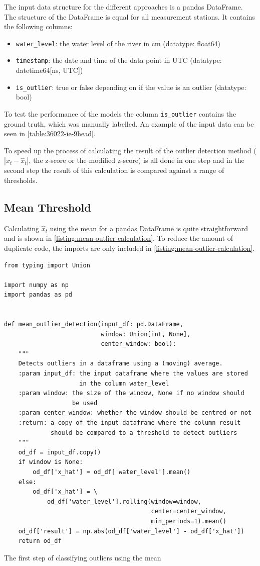The input data structure for the different approaches is a pandas DataFrame.\cite{PandasDocumentationPandas} The structure of the DataFrame is equal for all measurement stations. It contains the following columns:
\begin{itemize}
    \item \verb|water_level|: the water level of the river in cm (datatype: float64)
    \item \verb|timestamp|: the date and time of the data point in UTC (datatype: datetime64[ns, UTC])
    \item \verb|is_outlier|: true or false depending on if the value is an outlier (datatype: bool)
\end{itemize}
To test the performance of the models the column \verb|is_outlier| contains the ground truth, which was manually labelled. An example of the input data can be seen in \autoref{table:36022-ie-9head}.


To speed up the process of calculating the result of the outlier detection method ($|x_t - \hat{x}_t|$, the z-score or the modified z-score) is all done in one step and in the second step the result of this calculation is compared against a range of thresholds.
\subsection{Mean Threshold}
Calculating $\hat{x}_t$ using the mean for a pandas DataFrame \cite{PandasDocumentationPandas} is quite straightforward and is shown in \autoref{listing:mean-outlier-calculation}. To reduce the amount of duplicate code, the imports are only included in \autoref{listing:mean-outlier-calculation}.
\begin{listing}
\begin{verbatim}
from typing import Union

import numpy as np
import pandas as pd


def mean_outlier_detection(input_df: pd.DataFrame,
                           window: Union[int, None],
                           center_window: bool):
    """
    Detects outliers in a dataframe using a (moving) average.
    :param input_df: the input dataframe where the values are stored
                     in the column water_level
    :param window: the size of the window, None if no window should
                   be used
    :param center_window: whether the window should be centred or not
    :return: a copy of the input dataframe where the column result
             should be compared to a threshold to detect outliers
    """
    od_df = input_df.copy()
    if window is None:
        od_df['x_hat'] = od_df['water_level'].mean()
    else:
        od_df['x_hat'] = \
            od_df['water_level'].rolling(window=window,
                                         center=center_window,
                                         min_periods=1).mean()
    od_df['result'] = np.abs(od_df['water_level'] - od_df['x_hat'])
    return od_df
\end{verbatim}
\caption{The first step of classifying outliers using the mean}
\label{listing:mean-outlier-calculation}
\end{listing}

